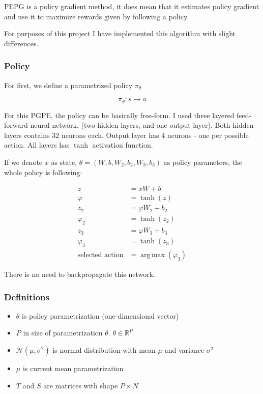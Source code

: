 \documentclass[12pt]{article}
\DeclareMathOperator*{\argmax}{arg\,max}
\begin{document}
PEPG is a policy gradient method, it does mean that it estimates policy gradient and use it to maximize rewards given by following a policy.

For purposes of this project I have implemented this algorithm with slight differences.

\subsubsection{Policy}

For first, we define a parametrized policy $\pi_\theta$

\begin{equation}
\pi_\theta: s \rightarrow a
\end{equation}

For this PGPE, the policy can be basically free-form. I used three layered feed-forward neural network. (two hidden layers, and one output layer).
Both hidden layers contains 32 neurons each. Output layer has 4 neurons - one per possible action. All layers has $\tanh$ activation function.

If we denote $x$ as state, $\theta = (W,b,W_2,b_2,W_3, b_3)$ as policy parameters, the whole policy is following:

\begin{equation}
\begin{aligned}
z &= xW + b \\
\varphi &= \tanh(z) \\
z_2 &= \varphi W_2 + b_2 \\
\varphi_2 &= \tanh(z_2) \\
z_3 &= \varphi W_3 + b_3 \\
\varphi_3 &= \tanh(z_3) \\
\text{selected action} &= \argmax(\varphi_3)
\end{aligned}
\end{equation}

There is no need to backpropagate this network.

\subsubsection{Definitions}

\begin{itemize}

\item $\theta$ is policy parametrization (one-dimensional vector)

\item $P$ in size of parametrization $\theta$. $\theta \in \mathbb{R}^P$

\item $\mathcal{N}(\mu, \sigma^2)$ is normal distribution with mean $\mu$ and variance $\sigma^2$

\item $\mu$ is current mean parametrization

\item $T$ and $S$ are matrices with shape $P\times N$

\end{itemize}
\end{document}
